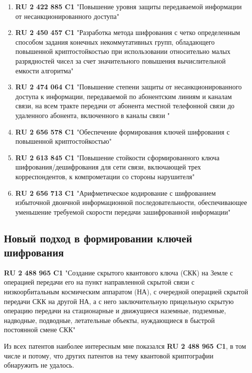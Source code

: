 \begin{enumerate}
    \item \textbf{RU 2 422 885 C1} "Повышение уровня защиты передаваемой информации от несанкционированного доступа" 

    \item \textbf{RU 2 450 457 C1} "Разработка метода шифрования с четко определенным способом задания конечных некоммутативных групп, обладающего повышенной криптостойкостью при использовании относительно малых разрядностей чисел за счет значительного повышения вычислительной емкости алгоритма"

    \item \textbf{RU 2 474 064 C1} "Повышение степени защиты от несанкционированного доступа к информации, передаваемой по абонентским линиям и каналам связи, на всем тракте передачи от абонента местной телефонной связи до удаленного абонента, включенного в каналы связи "

    \item \textbf{RU 2 656 578 C1} "Обеспечение формирования ключей шифрования с повышенной криптостойкостью"

    \item \textbf{RU 2 613 845 C1} "Повышение стойкости сформированного ключа шифрования/дешифрования для сети связи, включающей трех корреспондентов, к компрометации со стороны нарушителя"

    \item \textbf{RU 2 656 713 C1} "Арифметическое кодирование с шифрованием избыточной двоичной информационной последовательности, обеспечивающее уменьшение требуемой скорости передачи зашифрованной информации"
\end{enumerate}


\subsection{Новый подход в формировании ключей шифрования}

\textbf{RU 2 488 965 C1} "Создание скрытого квантового ключа (СКК) на Земле с операцией передачи его на пункт направленной скрытой связи с низкоорбитальным космическим аппаратом (НА), с очередной операцией скрытой передачи СКК на другой НА, а с него заключительную прицельную скрытую операцию передачи на стационарные и движущиеся наземные, подземные, надводные, подводные, летательные объекты, нуждающиеся в быстрой постоянной смене СКК"



Из всех патентов наиболее интересным мне показался \textbf{RU 2 488 965 C1}, в том числе и потому, что других патентов на тему квантовой криптографии обнаружить не удалось.